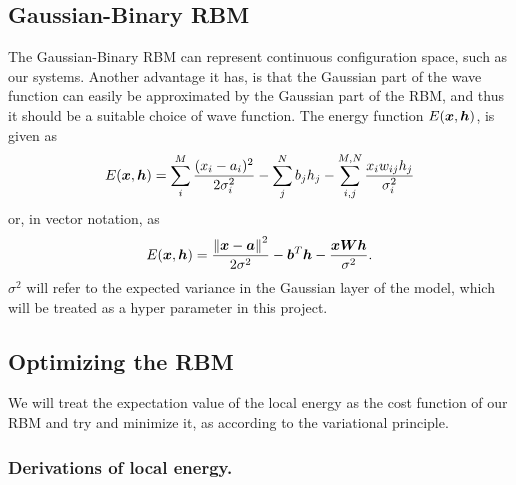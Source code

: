\subsection{Gaussian-Binary RBM}
The Gaussian-Binary RBM can represent continuous configuration space, such as our systems. Another advantage it has, is that the Gaussian part of the wave function can easily be approximated by the Gaussian part of the RBM, and thus it should be a suitable choice of wave function. The energy function $E\qty(\bm{x}, \bm{h})$, is given as 
\begin{equation*}
    E\qty(\bm{x}, \bm{h}) = \sum_i^M \frac{(x_i - a_i)^2}{2\sigma_i^2} - \sum_j^N b_j h_j - \sum_{i,j}^{M,N} \frac{x_i w_{ij} h_j}{\sigma_i^2} 
\end{equation*}
or, in vector notation, as 
\begin{equation}\label{eq:energy_function_RBM}
    E\qty(\bm{x}, \bm{h}) = \frac{\norm{\bm{x}-\bm{a}}^2}{2\sigma^2} - \bm{b}^T\bm{h} - \frac{\bm{x}\bm{W}\bm{h}}{\sigma^2}. 
\end{equation}
$\sigma^2$ will refer to the expected variance in the Gaussian layer of the model, which will be treated as a hyper parameter in this project. 

\subsection{Optimizing the RBM}
We will treat the expectation value of the local energy as the cost function of our RBM and try and minimize it, as according to the variational principle. 

\subsubsection{Derivations of local energy.}

